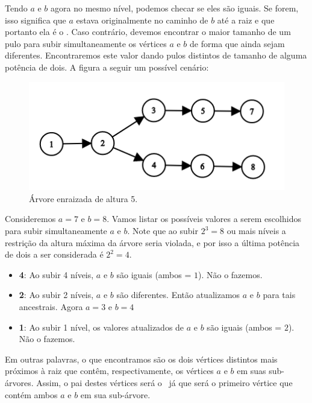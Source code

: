 Tendo $a$ e $b$ agora no mesmo nível, podemos checar se eles são iguais. Se forem, isso significa que $a$ estava originalmente no caminho de $b$ até a raiz e que portanto ela é o \LCA. Caso contrário, devemos encontrar o maior tamanho de um pulo para subir simultaneamente os vértices $a$ e $b$ de forma que ainda sejam diferentes. Encontraremos este valor dando pulos distintos de tamanho de alguma potência de dois. A figura a seguir um possível cenário:

\begin{figure}[htb]
\begin{center}
\includegraphics{images/graph_dp2.png}
\end{center}
\caption{\label{fig:arvore-5}Árvore enraizada de altura 5.}
\end{figure}


Consideremos $a = 7$ e $b = 8$. Vamos listar os possíveis valores a serem escolhidos para subir simultaneamente $a$ e $b$. Note que ao subir $2^3 = 8$ ou mais níveis a restrição da altura máxima da árvore seria violada, e por isso a última potência de dois a ser considerada é $2^2 = 4$.

\begin{itemize}
    \item \textbf{4}: Ao subir 4 níveis, $a$ e $b$ são iguais (ambos = $1$). Não o fazemos.
    \item \textbf{2}: Ao subir 2 níveis, $a$ e $b$ são diferentes. Então atualizamos $a$ e $b$ para tais ancestrais. Agora $a = 3$ e $b = 4$
    \item \textbf{1}: Ao subir 1 nível, os valores atualizados de $a$ e $b$ são iguais (ambos = $2$). Não o fazemos.
\end{itemize}

Em outras palavras, o que encontramos são os dois vértices distintos mais próximos à raiz que contêm, respectivamente, os vértices $a$ e $b$ em suas sub-árvores. Assim, o pai destes vértices será o \LCA\, já que será o primeiro vértice que contém ambos $a$ e $b$ em sua sub-árvore.

